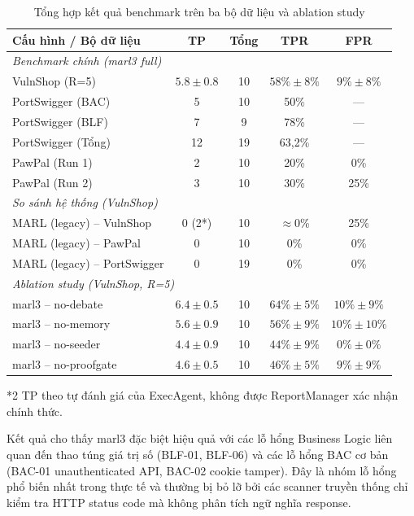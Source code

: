 \begin{table}[h]
\centering
\renewcommand{\arraystretch}{1.3}
\caption{Tổng hợp kết quả benchmark trên ba bộ dữ liệu và ablation study}
\label{tab:summary}
\begin{tabular}{|l|c|c|c|c|}
\hline
\textbf{Cấu hình / Bộ dữ liệu} & \textbf{TP} & \textbf{Tổng} & \textbf{TPR} & \textbf{FPR} \\
\hline
\multicolumn{5}{|l|}{\textit{Benchmark chính (marl3 full)}} \\
\hline
VulnShop (R=5) & $5.8 \pm 0.8$ & 10 & $58\%\pm8\%$ & $9\%\pm8\%$ \\
\hline
PortSwigger (BAC) & 5 & 10 & 50\% & --- \\
\hline
PortSwigger (BLF) & 7 & 9 & 78\% & --- \\
\hline
PortSwigger (Tổng) & 12 & 19 & 63,2\% & --- \\
\hline
PawPal (Run 1) & 2 & 10 & 20\% & 0\% \\
\hline
PawPal (Run 2) & 3 & 10 & 30\% & 25\% \\
\hline
\multicolumn{5}{|l|}{\textit{So sánh hệ thống (VulnShop)}} \\
\hline
MARL (legacy) -- VulnShop & 0 (2*) & 10 & $\approx$0\% & 25\% \\
\hline
MARL (legacy) -- PawPal & 0 & 10 & 0\% & 0\% \\
\hline
MARL (legacy) -- PortSwigger & 0 & 19 & 0\% & 0\% \\
\hline
\multicolumn{5}{|l|}{\textit{Ablation study (VulnShop, R=5)}} \\
\hline
marl3 -- no-debate & $6.4\pm0.5$ & 10 & $64\%\pm5\%$ & $10\%\pm9\%$ \\
\hline
marl3 -- no-memory & $5.6\pm0.9$ & 10 & $56\%\pm9\%$ & $10\%\pm10\%$ \\
\hline
marl3 -- no-seeder & $4.4\pm0.9$ & 10 & $44\%\pm9\%$ & $0\%\pm0\%$ \\
\hline
marl3 -- no-proofgate & $4.6\pm0.5$ & 10 & $46\%\pm5\%$ & $9\%\pm9\%$ \\
\hline
\end{tabular}
\end{table}

\begin{flushleft}
\small{*2 TP theo tự đánh giá của ExecAgent, không được ReportManager xác nhận chính thức.}
\end{flushleft}

Kết quả cho thấy marl3 đặc biệt hiệu quả với các lỗ hổng Business Logic liên quan đến thao túng giá trị số (BLF-01, BLF-06) và các lỗ hổng BAC cơ bản (BAC-01 unauthenticated API, BAC-02 cookie tamper). Đây là nhóm lỗ hổng phổ biến nhất trong thực tế và thường bị bỏ lỡ bởi các scanner truyền thống chỉ kiểm tra HTTP status code mà không phân tích ngữ nghĩa response.

